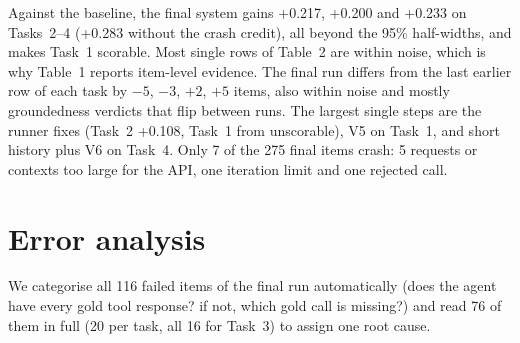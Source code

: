 \documentclass[10pt]{article}
\begin{document}
Against the baseline, the final system gains +0.217, +0.200 and +0.233 on Tasks~2--4 (+0.283
without the crash credit), all beyond the 95\% half-widths, and makes Task~1 scorable. Most single
rows of Table~2 are within noise, which is why Table~1 reports item-level evidence. The final run
differs from the last earlier row of each task by $-5$, $-3$, $+2$, $+5$ items, also within noise
and mostly groundedness verdicts that flip between runs. The largest single steps are the runner
fixes (Task~2 +0.108, Task~1 from unscorable), V5 on Task~1, and short history plus V6 on Task~4.
Only 7 of the 275 final items crash: 5 requests or contexts too large for the API, one iteration
limit and one rejected call.

\section{Error analysis}
We categorise all 116 failed items of the final run automatically (does the agent have every gold
tool response? if not, which gold call is missing?) and read 76 of them in full (20 per task, all
16 for Task~3) to assign one root cause.
\end{document}
